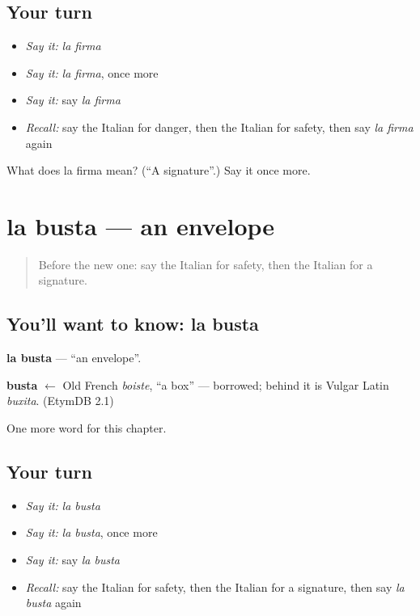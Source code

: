 \subsection*{Your turn}
\begin{itemize}
\raggedright
  \item \emph{Say it:} \emph{la firma}
  \item \emph{Say it:} \emph{la firma}, once more
  \item \emph{Say it:} say \emph{la firma}
  \item \emph{Recall:} say the Italian for danger, then the Italian for safety, then say \emph{la firma} again
\end{itemize}

\begin{tcolorbox}[breakable,colback=teal!4,colframe=teal!35!black,title={Before you move on}]
What does la firma mean? (\textquotedblleft{}A signature\textquotedblright{}.) Say it once more.
\end{tcolorbox}
\section[la busta]{la busta — an envelope}

\label{lesson:IT-C166-busta}



\begin{quote}
Before the new one: say the Italian for safety, then the Italian for a signature.
\end{quote}

\subsection*{You'll want to know: la busta}
\textbf{la busta} — \textquotedblleft{}an envelope\textquotedblright{}.

\begin{cousinweb}
\textbf{busta} $\leftarrow$ Old French \emph{boiste}, \textquotedblleft{}a box\textquotedblright{} — borrowed; behind it is Vulgar Latin \emph{buxita}. (EtymDB 2.1)
\end{cousinweb}

\begin{grammarlens}[title={What you've built}]
One more word for this chapter.
\end{grammarlens}

\subsection*{Your turn}
\begin{itemize}
\raggedright
  \item \emph{Say it:} \emph{la busta}
  \item \emph{Say it:} \emph{la busta}, once more
  \item \emph{Say it:} say \emph{la busta}
  \item \emph{Recall:} say the Italian for safety, then the Italian for a signature, then say \emph{la busta} again
\end{itemize}

